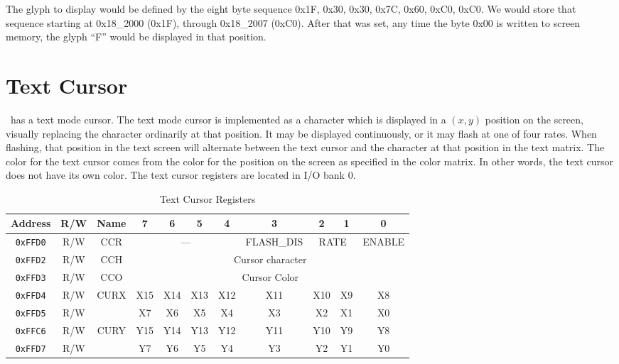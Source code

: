 The glyph to display would be defined by the eight byte sequence 0x1F, 0x30, 0x30, 0x7C, 0x60, 0xC0, 0xC0. We would store that sequence starting at 0x18\_2000 (0x1F), through 0x18\_2007 (0xC0). After that was set, any time the byte 0x00 is written to screen memory, the glyph ``F'' would be displayed in that position.

\section*{Text Cursor}

\jr\ has a text mode cursor. The text mode cursor is implemented as a character which is displayed in a $(x, y)$ position on the screen, visually replacing the character ordinarily at that position. It may be displayed continuously, or it may flash at one of four rates. When flashing, that position in the text screen will alternate between the text cursor and the character at that position in the text matrix. The color for the text cursor comes from the color for the position on the screen as specified in the color matrix. In other words, the text cursor does not have its own color. The text cursor registers are located in I/O bank 0.

\begin{table}[ht]
    \begin{center}
        \begin{tabular}{|c|c|c|c|c|c|c|c|c|c|c|} \hline
            Address & R/W & Name & 7 & 6 & 5 & 4 & 3 & 2 & 1 & 0 \\\hline\hline
            \verb+0xFFD0+ & R/W & CCR & \multicolumn{4}{|c|}{---} & FLASH\_DIS & \multicolumn{2}{|c|}{RATE} & ENABLE \\ \hline
            \verb+0xFFD2+ & R/W & CCH & \multicolumn{8}{|c|}{Cursor character} \\ \hline
            \verb+0xFFD3+ & R/W & CCO & \multicolumn{8}{|c|}{Cursor Color} \\ \hline            
            \verb+0xFFD4+ & R/W &  \multirow{2}{*}{CURX} & X15 & X14 & X13 & X12 & X11 & X10 & X9 & X8 \\ \cline{1-2}\cline{4-11}
            \verb+0xFFD5+ & R/W &  & X7 & X6 & X5 & X4 & X3 & X2 & X1 & X0 \\ \hline 
            \verb+0xFFC6+ & R/W &  \multirow{2}{*}{CURY} & Y15 & Y14 & Y13 & Y12 & Y11 & Y10 & Y9 & Y8 \\ \cline{1-2}\cline{4-11}
            \verb+0xFFD7+ & R/W &  & Y7 & Y6 & Y5 & Y4 & Y3 & Y2 & Y1 & Y0 \\ \hline
        \end{tabular}
    \end{center}
    \caption{Text Cursor Registers}
    \label{tab:txt_crsr_reg}
\end{table}

